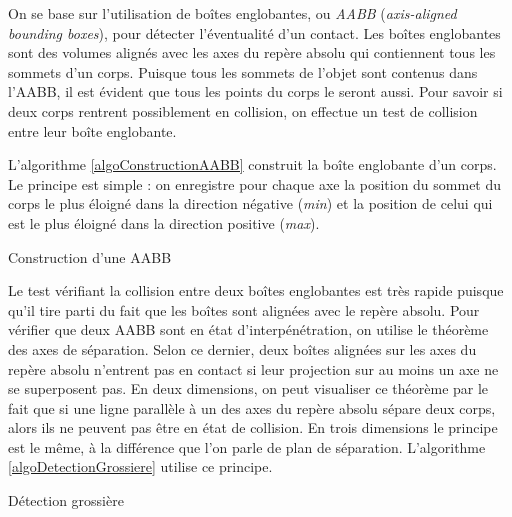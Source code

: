 On se base sur l'utilisation de boîtes englobantes, ou \textit{AABB}
(\textit{axis-aligned bounding boxes}), pour détecter l'éventualité
d'un contact. Les boîtes englobantes sont des volumes alignés avec les
axes du repère absolu qui contiennent tous les sommets d'un
corps. Puisque tous les sommets de l'objet sont contenus dans l'AABB,
il est évident que tous les points du corps le seront aussi. Pour
savoir si deux corps rentrent possiblement en collision, on effectue
un test de collision entre leur boîte englobante.

L'algorithme \ref{algoConstructionAABB} construit la boîte englobante
d'un corps. Le principe est simple : on enregistre pour chaque axe la
position du sommet du corps le plus éloigné dans la direction négative
(\textit{min}) et la position de celui qui est le plus éloigné dans la
direction positive (\textit{max}).

\begin{algorithm}[h]
  \caption{Construction d'une AABB}
  \label{algoConstructionAABB}
  \dontprintsemicolon
  \BlankLine
  \BlankLine
  \BlankLine
\end{algorithm}

Le test vérifiant la collision entre deux boîtes englobantes est très
rapide puisque qu'il tire parti du fait que les boîtes sont alignées
avec le repère absolu. Pour vérifier que deux AABB sont en état
d'interpénétration, on utilise le théorème des axes de séparation.
Selon ce dernier, deux boîtes alignées sur les axes du repère absolu
n'entrent pas en contact si leur projection sur au moins un axe ne se
superposent pas. En deux dimensions, on peut visualiser ce théorème
par le fait que si une ligne parallèle à un des axes du repère absolu
sépare deux corps, alors ils ne peuvent pas être en état de
collision. En trois dimensions le principe est le même, à la
différence que l'on parle de plan de séparation. L'algorithme
\ref{algoDetectionGrossiere} utilise ce principe.

\begin{algorithm}[h]
  \caption{Détection grossière}
  \label{algoDetectionGrossiere}
  \dontprintsemicolon
  \BlankLine
  \BlankLine
\end{algorithm}

